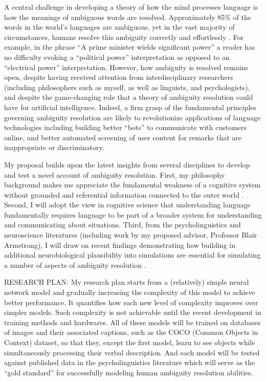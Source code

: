 \documentclass[letterpaper, 12pt]{article}
\begin{document}


A central challenge in developing a theory of how the mind processes language is how the meanings of ambiguous words are resolved. Approximately 85\% of the words in the world's languages are ambiguous, yet in the vast majority of circumstances, humans resolve this ambiguity correctly and effortlessly \citep{KleinRepresentationPolysemousWords2001}.  For example, in the phrase ``A prime minister wields significant power'' a reader has no difficulty evoking a ``political power'' interpretation as opposed to an ``electrical power'' interpretation.  However, how ambiguity is resolved remains open, despite having received attention from interdisciplinary researchers (including philosophers such as myself, as well as linguists, and psychologists), and despite the game-changing role that a theory of ambiguity resolution could have for artificial intelligence. Indeed, a firm grasp of the fundamental principles governing ambiguity resolution are likely to revolutionize applications of language technologies including building better ``bots'' to communicate with customers online, and better automated screening of user content for remarks that are inappropriate or discriminatory.  

My proposal builds upon the latest insights from several disciplines to develop and test a novel account of ambiguity resolution. First, my philosophy background makes me appreciate the fundamental weakness of a cognitive system without grounded and referential information connected to the outer world \citep{harnadSymbolGroundingProblem1990, searleMindsBrainsPrograms1980}. Second, I will adopt the view in cognitive science that understanding language fundamentally requires language to be part of a broader system for understanding and communicating about situations. Third, from the psycholinguistics and neuroscience literatures (including work by my proposed advisor, Professor Blair Armstrong), I will draw on recent findings demonstrating how building in additional neurobiological plausibility into simulations are essential for simulating a number of aspects of ambiguity resolution \citep{Armstrong2016Disparatesemanticambiguity}.

RESEARCH PLAN: My research plan starts from a (relatively) simple neural network model and gradually increasing the complexity of this model to achieve better performance. It quantifies how each new level of complexity improves over simpler models. Such complexity is not achievable until the recent development in training methods and hardwares. All of these models will be trained on databases of images and their associated captions, such as the COCO (Common Objects in Context) dataset, so that they, except the first model, learn to see objects while simultaneously processing their verbal description. And each model will be tested against published data in the psycholinguistics literature which will serve as the ``gold standard'' for successfully modeling human ambiguity resolution abilities.
\end{document}
